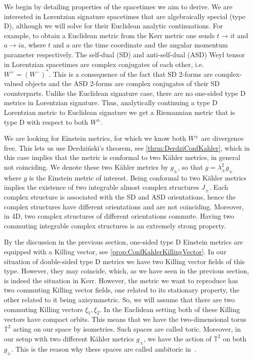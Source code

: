 \documentclass[10pt]{report}
\newcommand{\derd}[0]{Derdzi\'nski}
\theoremstyle{definition}
\begin{document}
We begin by detailing properties of the spacetimes we aim to derive. We are interested in Lorentzian signature spacetimes that are algebraically special (type D), although we will solve for their Euclidean analytic continuations.
For example, to obtain a Euclidean metric from the Kerr metric one sends $t \rightarrow it$ and $a \rightarrow ia$, where $t$ and $a$ are the time coordinate and the angular momentum parameter respectively. The self-dual (SD) and anti-self-dual (ASD) Weyl tensor in Lorentzian spacetimes are complex conjugates of each other, i.e. $W^+ = (W^-)^*$.
This is a consequence of the fact that SD 2-forms are complex-valued objects and the ASD 2-forms are complex conjugates of their SD counterparts.
Unlike the Euclidean signature case, there are no one-sided type D metrics in Lorentzian signature. Thus, analytically continuing a type D Lorentzian metric to Euclidean signature we get a Riemannian metric that is type D with respect to both $W^\pm$. 

We are looking for Einstein metrics, for which we know both $W^\pm$ are divergence free. This lets us use \derd{}'s theorem, see \cref{thrm:DerdziConfKahler}, which in this case implies that the metric is conformal to two K\"ahler metrics, in general not coinciding. We denote these two K\"ahler metrics by $g_\pm$, so that $g = \lambda^2_\pm g_\pm$ where $g$ is the Einstein metric of interest. Being conformal to two K\"ahler metrics implies the existence of two integrable almost complex structures $J_\pm$. Each complex structure is associated with the SD and ASD orientations, hence the complex structures have different orientations and are not coinciding. Moreover, in 4D, two complex structures of different orientations commute. Having two commuting integrable complex structures is an extremely strong property.

By the discussion in the previous section, one-sided type D Einstein metrics are equipped with a Killing vector, see \cref{prop:ConfKahlerKillingVector}. In our situation of double-sided type D metrics we have two Killing vector fields of this type. However, they may coincide, which, as we have seen in the previous section, is indeed the situation in Kerr. However, the metric we want to reproduce has two commuting Killing vector fields, one related to its stationary property, the other related to it being axisymmetric. So, we will assume that there are two commuting Killing vectors $\xi_1,\xi_2$. In the Euclidean setting both of these Killing vectors have compact orbits. This means that we have the two-dimensional torus $\mathbb{T}^2$ acting on our space by isometries. Such spaces are called toric. Moreover, in our setup with two different K\"ahler metrics $g_\pm$, we have the action of $\mathbb{T}^2$ on both $g_\pm$. This is the reason why these spaces are called ambitoric in~\cite{AmbitoricGeomeAposto2013}.
\end{document}
